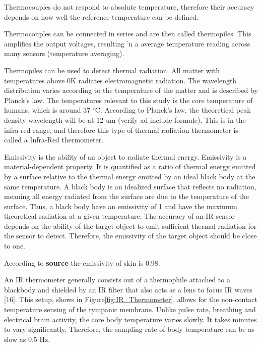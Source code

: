 Thermocouples do not respond to absolute temperature, therefore their accuracy depends on how well the reference temperature can be defined.

Thermocouples can be connected in series and are then called thermopiles. This amplifies the output voltages, resulting 'n a average temperature reading across many sensors (temperature averaging).

Thermopiles can be used to detect thermal radiation. All matter with temperatures above 0K radiates electromagnetic radiation. The wavelength distribution varies according to the temperature of the matter and is described by Planck's law. The temperatures relevant to this study is the core temperature of humans, which is around 37 $^{\circ}$C. According to Planck's law, the theoretical peak density wavelength will be at 12 um (verify ad include formule). This is in the infra red range, and therefore this type of thermal radiation thermometer is called a Infra-Red thermometer.

Emissivity is the ability of an object to radiate thermal energy. Emissivity is a material-dependent property. It is quantified as a ratio of thermal energy emitted by a surface relative to the thermal energy emitted by an ideal black body at the same temperature. A black body is an idealized surface that reflects no radiation, meaning all energy radiated from the surface are due to the temperature of the surface. Thus, a black body have an emissivity of 1 and have the maximum theoretical radiation at a given temperature. The accuracy of an IR sensor depends on the ability of the target object to emit sufficient thermal radiation for the sensor to detect. Therefore, the emissivity of the target object should be close to one.

According to \textbf{source} the emissivity of skin is 0.98.

An IR thermometer generally consists out of a thermophile attached to a blackbody and shielded by an IR filter that also acts as a lens to focus IR waves [16]. This setup, shows in Figure\ref{fig:IR_Thermometer}, allows for the non-contact temperature sensing of the tympanic membrane. Unlike pulse rate, breathing and electrical brain activity, the core body temperature varies slowly. It takes minutes to vary significantly. Therefore, the sampling rate of body temperature can be as slow as 0.5 Hz.

